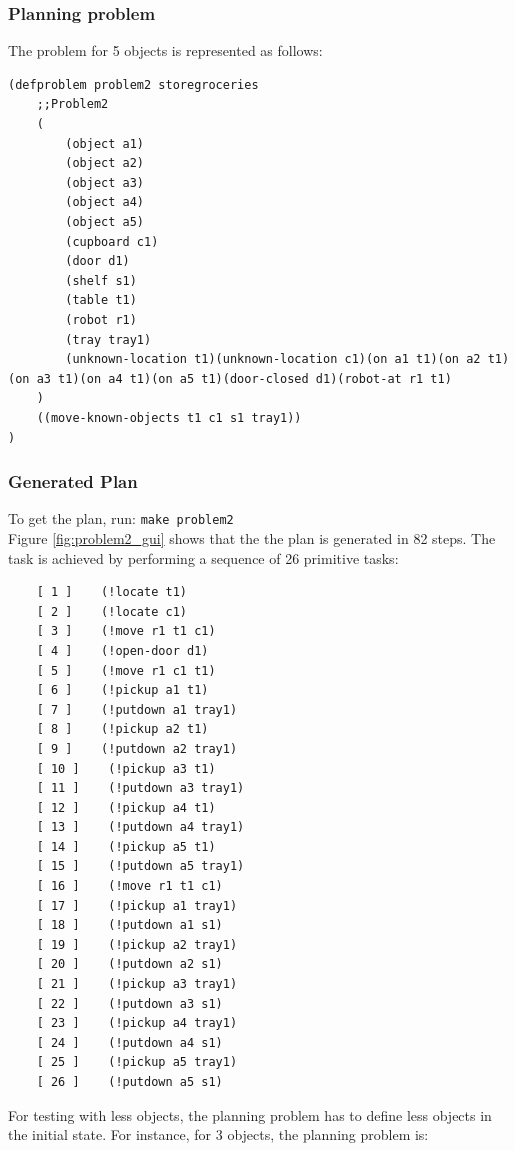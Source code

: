 \documentclass[paper=a4, fontsize=11pt]{scrartcl}
\begin{document}
	\subsubsection*{Planning problem}

	The problem for 5 objects is represented as follows:

	\begin{lstlisting}
(defproblem problem2 storegroceries
	;;Problem2
	(
		(object a1)
		(object a2)
		(object a3)
		(object a4)
		(object a5)
		(cupboard c1)
		(door d1)
		(shelf s1)
		(table t1)
		(robot r1)
		(tray tray1)
		(unknown-location t1)(unknown-location c1)(on a1 t1)(on a2 t1)(on a3 t1)(on a4 t1)(on a5 t1)(door-closed d1)(robot-at r1 t1)
	)
	((move-known-objects t1 c1 s1 tray1))
)
	\end{lstlisting}

	\subsubsection*{Generated Plan}

	To get the plan, run: \verb|make problem2| \\

	Figure \ref{fig:problem2_gui} shows that the the plan is generated in 82 steps. The task is achieved by performing a sequence of 26 primitive tasks: \\

	\begin{lstlisting}
	[ 1 ]    (!locate t1)
	[ 2 ]    (!locate c1)
	[ 3 ]    (!move r1 t1 c1)
	[ 4 ]    (!open-door d1)
	[ 5 ]    (!move r1 c1 t1)
	[ 6 ]    (!pickup a1 t1)
	[ 7 ]    (!putdown a1 tray1)
	[ 8 ]    (!pickup a2 t1)
	[ 9 ]    (!putdown a2 tray1)
	[ 10 ]    (!pickup a3 t1)
	[ 11 ]    (!putdown a3 tray1)
	[ 12 ]    (!pickup a4 t1)
	[ 13 ]    (!putdown a4 tray1)
	[ 14 ]    (!pickup a5 t1)
	[ 15 ]    (!putdown a5 tray1)
	[ 16 ]    (!move r1 t1 c1)
	[ 17 ]    (!pickup a1 tray1)
	[ 18 ]    (!putdown a1 s1)
	[ 19 ]    (!pickup a2 tray1)
	[ 20 ]    (!putdown a2 s1)
	[ 21 ]    (!pickup a3 tray1)
	[ 22 ]    (!putdown a3 s1)
	[ 23 ]    (!pickup a4 tray1)
	[ 24 ]    (!putdown a4 s1)
	[ 25 ]    (!pickup a5 tray1)
	[ 26 ]    (!putdown a5 s1)
	\end{lstlisting}

	\vspace{5mm}


	For testing with less objects, the planning problem has to define less objects in the initial state. For instance, for 3 objects, the planning problem is: \\
\end{document}
